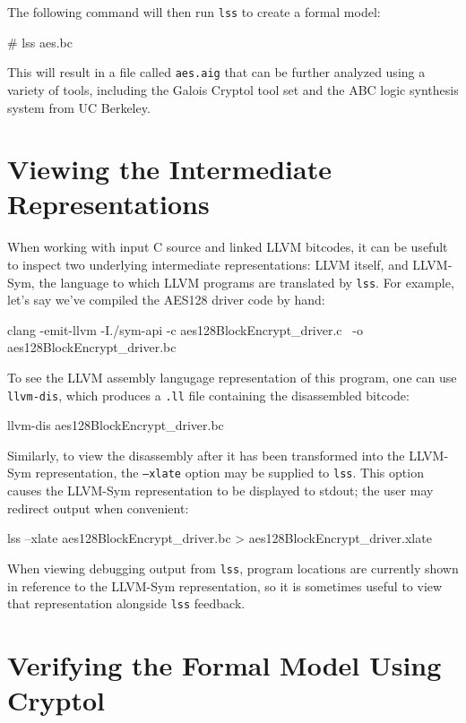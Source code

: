\documentclass[11pt]{article}
\begin{document}
The following command will then run \texttt{lss} to create a formal
model:

\begin{code}
# lss aes.bc
\end{code}

This will result in a file called \texttt{aes.aig} that can be further
analyzed using a variety of tools, including the Galois Cryptol tool set
and the ABC logic synthesis system from UC Berkeley.

\section{Viewing the Intermediate Representations}

When working with input C source and linked LLVM bitcodes, it can be
usefult to inspect two underlying intermediate representations: LLVM
itself, and LLVM-Sym, the language to which LLVM programs are translated
by \texttt{lss}.  For example, let's say we've compiled the AES128
driver code by hand:

\begin{code}
clang -emit-llvm -I./sym-api -c aes128BlockEncrypt_driver.c \
  -o aes128BlockEncrypt_driver.bc
\end{code}

To see the LLVM assembly langugage representation of this program, one
can use \texttt{llvm-dis}, which produces a \texttt{.ll} file containing
the disassembled bitcode:

\begin{code}
llvm-dis aes128BlockEncrypt_driver.bc
\end{code}

Similarly, to view the disassembly after it has been transformed into
the LLVM-Sym representation, the \texttt{--xlate} option may be supplied
to \texttt{lss}.  This option causes the LLVM-Sym representation to be
displayed to stdout; the user may redirect output when convenient:

\begin{code}
lss --xlate aes128BlockEncrypt_driver.bc > aes128BlockEncrypt_driver.xlate
\end{code}

When viewing debugging output from \texttt{lss}, program locations are
currently shown in reference to the LLVM-Sym representation, so it is
sometimes useful to view that representation alongside \texttt{lss}
feedback.

\section{Verifying the Formal Model Using Cryptol}
\end{document}
